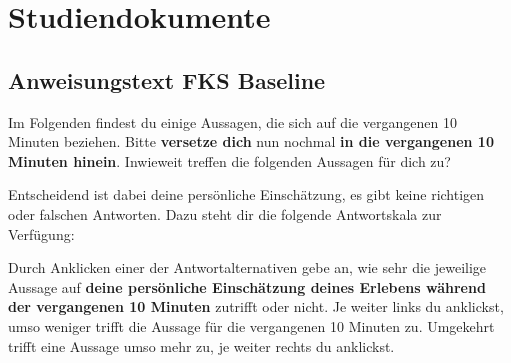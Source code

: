 \chapter{Studiendokumente} 
\section{Anweisungstext FKS Baseline} 
Im Folgenden findest du einige Aussagen, die sich auf die vergangenen 10 Minuten beziehen. Bitte \textbf{versetze dich} nun nochmal \textbf{in die vergangenen 10 Minuten hinein}. Inwieweit treffen die folgenden Aussagen für dich zu?

Entscheidend ist dabei deine persönliche Einschätzung, es gibt keine richtigen oder falschen Antworten. Dazu steht dir die folgende Antwortskala zur Verfügung: 

Durch Anklicken einer der Antwortalternativen gebe an, wie sehr die jeweilige Aussage auf \textbf{deine persönliche Einschätzung deines Erlebens während der vergangenen 10 Minuten} zutrifft oder nicht. Je weiter links du anklickst, umso weniger trifft die Aussage für die vergangenen 10 Minuten zu. Umgekehrt trifft eine Aussage umso mehr zu, je weiter rechts du anklickst. 
\pagebreak

